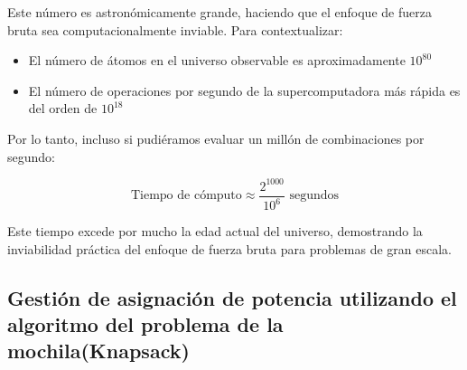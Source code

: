 \documentclass[9pt,a4paper,twoside]{rho-class/rho}
\begin{document}
            Este número es astronómicamente grande, haciendo que el enfoque de fuerza bruta sea computacionalmente inviable. Para contextualizar:

            \begin{itemize}
                \item El número de átomos en el universo observable es aproximadamente $10^{80}$
                \item El número de operaciones por segundo de la supercomputadora más rápida es del orden de $10^{18}$
            \end{itemize}

            Por lo tanto, incluso si pudiéramos evaluar un millón de combinaciones por segundo:

            \begin{equation}
                \text{Tiempo de cómputo} \approx \frac{2^{1000}}{10^6} \text{ segundos}
            \end{equation}

            Este tiempo excede por mucho la edad actual del universo, demostrando la inviabilidad práctica del enfoque de fuerza bruta para problemas de gran escala.
                
        \subsection[Gestión de asignación de potencia (Knapsack)]{Gestión de asignación de potencia utilizando el algoritmo del problema de la mochila(Knapsack)}
\end{document}
